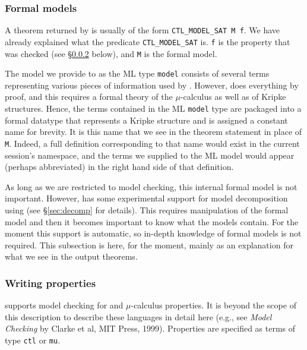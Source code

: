 \subsubsection{Formal models}\label{sec:formal_models}

A theorem returned by \hc{} is usually of the form \texttt{CTL\_MODEL\_SAT M f}. We have already explained what the predicate \texttt{CTL\_MODEL\_SAT} is. \texttt{f} is the property that was checked (see \S\ref{sec:prop} below), and \texttt{M} is the formal model.

The model we provide to \hc{} as the ML type \texttt{model} consists of several \HOL{} terms representing various pieces of information used by \hc{}. However, \hc{} does everything by proof, and this requires a formal \HOL{} theory of the \( \mu\)-calculus as well as of Kripke structures. Hence, the terms contained in the ML \texttt{model} type are packaged into a formal \HOL{} datatype that represents a Kripke structure and is assigned a constant name for brevity. It is this name that we see in the theorem statement in place of \texttt{M}. Indeed, a full \HOL{} definition corresponding to that name would exist in the current session's namespace, and the \HOL{} terms we supplied to the ML model would appear (perhaps abbreviated) in the right hand side of that definition.

As long as we are restricted to model checking, this internal formal model is not important. However, \hc{} has some experimental support for model decomposition using \HOL{} (see \S\ref{sec:decomp} for details). This requires manipulation of the formal model and then it becomes important to know what the models contain. For the moment this support is automatic, so in-depth knowledge of formal models is not required. This subsection is here, for the moment, mainly as an explanation for what we see in the \hc{} output theorems.

\subsubsection{Writing properties}\label{sec:prop}

\hc{} supports model checking for \ctl and \(\mu\)-calculus properties. It is beyond the scope of this description to describe these languages in detail here (e.g., see \emph{Model Checking} by Clarke et al, MIT Press, 1999). Properties are specified as \HOL{} terms of type \texttt{ctl} or \texttt{mu}.

